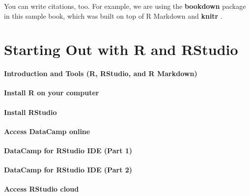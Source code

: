 \documentclass[]{book}
\theoremstyle{definition}
\theoremstyle{definition}
\theoremstyle{definition}
\theoremstyle{remark}
\begin{document}
You can write citations, too. For example, we are using the
\textbf{bookdown} package \citep{R-bookdown} in this sample book, which
was built on top of R Markdown and \textbf{knitr} \citep{xie2015}.

\hypertarget{starting-out-with-r-and-rstudio}{%
\chapter{Starting Out with R and
RStudio}\label{starting-out-with-r-and-rstudio}}

\hypertarget{introduction-and-tools-r-rstudio-and-r-markdown}{%
\subsubsection{Introduction and Tools (R, RStudio, and R
Markdown)}\label{introduction-and-tools-r-rstudio-and-r-markdown}}

\hypertarget{install-r-on-your-computer}{%
\subsubsection{Install R on your
computer}\label{install-r-on-your-computer}}

\hypertarget{install-rstudio}{%
\subsubsection{Install RStudio}\label{install-rstudio}}

\hypertarget{access-datacamp-online}{%
\subsubsection{Access DataCamp online}\label{access-datacamp-online}}

\hypertarget{datacamp-for-rstudio-ide-part-1}{%
\subsubsection{DataCamp for RStudio IDE (Part
1)}\label{datacamp-for-rstudio-ide-part-1}}

\hypertarget{datacamp-for-rstudio-ide-part-2}{%
\subsubsection{DataCamp for RStudio IDE (Part
2)}\label{datacamp-for-rstudio-ide-part-2}}

\hypertarget{access-rstudio-cloud}{%
\subsubsection{Access RStudio cloud}\label{access-rstudio-cloud}}
\end{document}
